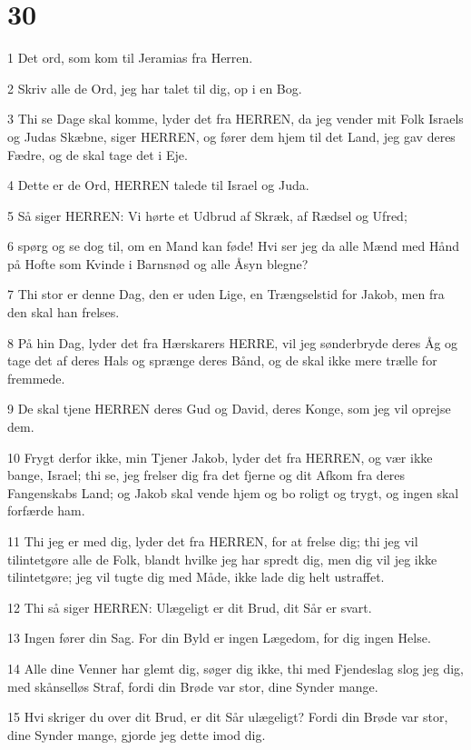 \chapter{30}

\par 1 Det ord, som kom til Jeramias fra Herren.
\par 2 Skriv alle de Ord, jeg har talet til dig, op i en Bog.
\par 3 Thi se Dage skal komme, lyder det fra HERREN, da jeg vender mit Folk Israels og Judas Skæbne, siger HERREN, og fører dem hjem til det Land, jeg gav deres Fædre, og de skal tage det i Eje.
\par 4 Dette er de Ord, HERREN talede til Israel og Juda.
\par 5 Så siger HERREN: Vi hørte et Udbrud af Skræk, af Rædsel og Ufred;
\par 6 spørg og se dog til, om en Mand kan føde! Hvi ser jeg da alle Mænd med Hånd på Hofte som Kvinde i Barnsnød og alle Åsyn blegne?
\par 7 Thi stor er denne Dag, den er uden Lige, en Trængselstid for Jakob, men fra den skal han frelses.
\par 8 På hin Dag, lyder det fra Hærskarers HERRE, vil jeg sønderbryde deres Åg og tage det af deres Hals og sprænge deres Bånd, og de skal ikke mere trælle for fremmede.
\par 9 De skal tjene HERREN deres Gud og David, deres Konge, som jeg vil oprejse dem.
\par 10 Frygt derfor ikke, min Tjener Jakob, lyder det fra HERREN, og vær ikke bange, Israel; thi se, jeg frelser dig fra det fjerne og dit Afkom fra deres Fangenskabs Land; og Jakob skal vende hjem og bo roligt og trygt, og ingen skal forfærde ham.
\par 11 Thi jeg er med dig, lyder det fra HERREN, for at frelse dig; thi jeg vil tilintetgøre alle de Folk, blandt hvilke jeg har spredt dig, men dig vil jeg ikke tilintetgøre; jeg vil tugte dig med Måde, ikke lade dig helt ustraffet.
\par 12 Thi så siger HERREN: Ulægeligt er dit Brud, dit Sår er svart.
\par 13 Ingen fører din Sag. For din Byld er ingen Lægedom, for dig ingen Helse.
\par 14 Alle dine Venner har glemt dig, søger dig ikke, thi med Fjendeslag slog jeg dig, med skånselløs Straf, fordi din Brøde var stor, dine Synder mange.
\par 15 Hvi skriger du over dit Brud, er dit Sår ulægeligt? Fordi din Brøde var stor, dine Synder mange, gjorde jeg dette imod dig.
